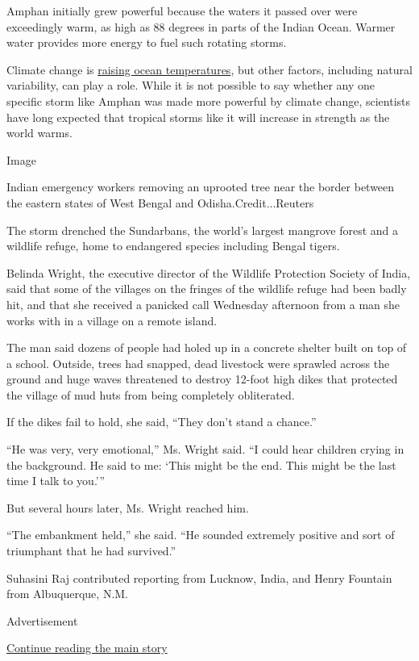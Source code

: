 Amphan initially grew powerful because the waters it passed over were
exceedingly warm, as high as 88 degrees in parts of the Indian Ocean.
Warmer water provides more energy to fuel such rotating storms.

Climate change is
\href{https://www.nytimes.com/2020/05/18/climate/climate-changes-hurricane-intensity.html}{raising
ocean temperatures}, but other factors, including natural variability,
can play a role. While it is not possible to say whether any one
specific storm like Amphan was made more powerful by climate change,
scientists have long expected that tropical storms like it will increase
in strength as the world warms.

Image

Indian emergency workers removing an uprooted tree near the border
between the eastern states of West Bengal and Odisha.Credit...Reuters

The storm drenched the Sundarbans, the world's largest mangrove forest
and a wildlife refuge, home to endangered species including Bengal
tigers.

Belinda Wright, the executive director of the Wildlife Protection
Society of India, said that some of the villages on the fringes of the
wildlife refuge had been badly hit, and that she received a panicked
call Wednesday afternoon from a man she works with in a village on a
remote island.

The man said dozens of people had holed up in a concrete shelter built
on top of a school. Outside, trees had snapped, dead livestock were
sprawled across the ground and huge waves threatened to destroy 12-foot
high dikes that protected the village of mud huts from being completely
obliterated.

If the dikes fail to hold, she said, ``They don't stand a chance.''

``He was very, very emotional,'' Ms. Wright said. ``I could hear
children crying in the background. He said to me: `This might be the
end. This might be the last time I talk to you.'''

But several hours later, Ms. Wright reached him.

``The embankment held,'' she said. ``He sounded extremely positive and
sort of triumphant that he had survived.''

Suhasini Raj contributed reporting from Lucknow, India, and Henry
Fountain from Albuquerque, N.M.

Advertisement

\protect\hyperlink{after-bottom}{Continue reading the main story}

